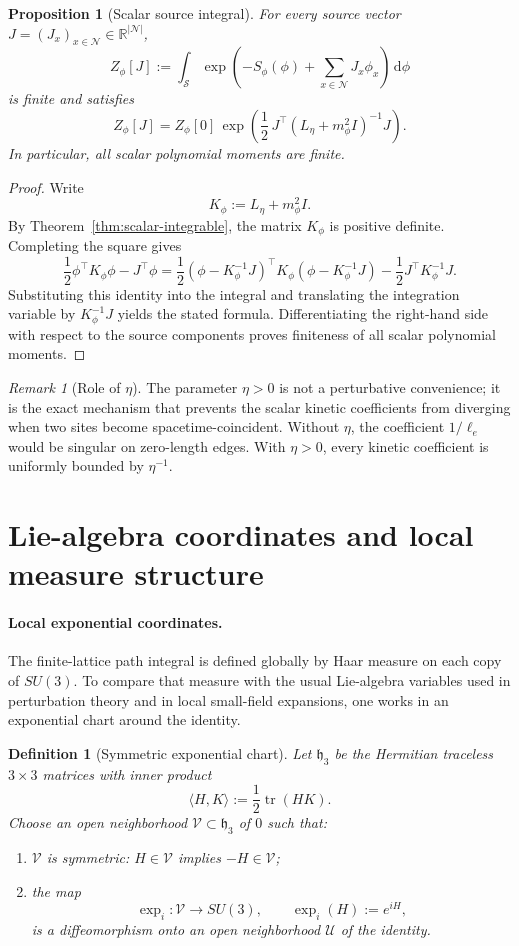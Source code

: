 \documentclass[11pt]{article}
\newtheorem{definition}[theorem]{Definition}
\newtheorem{proposition}[theorem]{Proposition}
\theoremstyle{remark}
\newtheorem{remark}[theorem]{Remark}
\newcommand{\R}{\mathbb R}
\newcommand{\mcN}{\mathcal N}
\newcommand{\mcS}{\mathscr S}
\newcommand{\tr}{\operatorname{tr}}
\newcommand{\dd}{\,\mathrm d}
\newcommand{\mcHh}{\mathfrak h_3}
\begin{document}
\begin{proposition}[Scalar source integral]
\label{prop:scalar-source}
For every source vector $J=(J_x)_{x\in\mcN}\in\R^{|\mcN|}$,
\[
Z_\phi[J]
:=
\int_{\mcS}\exp\!\left(-S_\phi(\phi)+\sum_{x\in\mcN}J_x\phi_x\right)\dd\phi
\]
is finite and satisfies
\[
Z_\phi[J]
=
Z_\phi[0]\,
\exp\!\left(\frac12\,J^\top (L_\eta+m_\phi^2 I)^{-1}J\right).
\]
In particular, all scalar polynomial moments are finite.
\end{proposition}
\begin{proof}
Write
\[
K_\phi:=L_\eta+m_\phi^2 I.
\]
By Theorem~\ref{thm:scalar-integrable}, the matrix $K_\phi$ is positive
definite.  Completing the square gives
\[
\frac12\phi^\top K_\phi\phi-J^\top\phi
=
\frac12(\phi-K_\phi^{-1}J)^\top K_\phi(\phi-K_\phi^{-1}J)
-\frac12 J^\top K_\phi^{-1}J.
\]
Substituting this identity into the integral and translating the integration
variable by $K_\phi^{-1}J$ yields the stated formula.  Differentiating the
right-hand side with respect to the source components proves finiteness of all
scalar polynomial moments.
\end{proof}

\begin{remark}[Role of $\eta$]
\label{rem:eta}
The parameter $\eta>0$ is not a perturbative convenience; it is the exact
mechanism that prevents the scalar kinetic coefficients from diverging when two
sites become spacetime-coincident.  Without $\eta$, the coefficient
$1/\ell_e$ would be singular on zero-length edges.  With $\eta>0$, every
kinetic coefficient is uniformly bounded by $\eta^{-1}$.
\end{remark}

\section{Lie-algebra coordinates and local measure structure}
\label{sec:local-measure}

\paragraph{Local exponential coordinates.}
The finite-lattice path integral is defined globally by Haar measure on each
copy of $SU(3)$.  To compare that measure with the usual Lie-algebra variables
used in perturbation theory and in local small-field expansions, one works in
an exponential chart around the identity.

\begin{definition}[Symmetric exponential chart]
\label{def:exp-chart}
Let $\mcHh$ be the Hermitian traceless $3\times 3$ matrices with inner product
\[
\langle H,K\rangle:=\frac12\tr(HK).
\]
Choose an open neighborhood $\mathcal V\subset\mcHh$ of $0$ such that:
\begin{enumerate}[leftmargin=1.5em]
\item $\mathcal V$ is symmetric: $H\in\mathcal V$ implies $-H\in\mathcal V$;
\item the map
\[
\exp_i:\mathcal V\to SU(3),
\qquad
\exp_i(H):=e^{iH},
\]
is a diffeomorphism onto an open neighborhood $\mathcal U$ of the identity.
\end{enumerate}
\end{definition}
\end{document}

